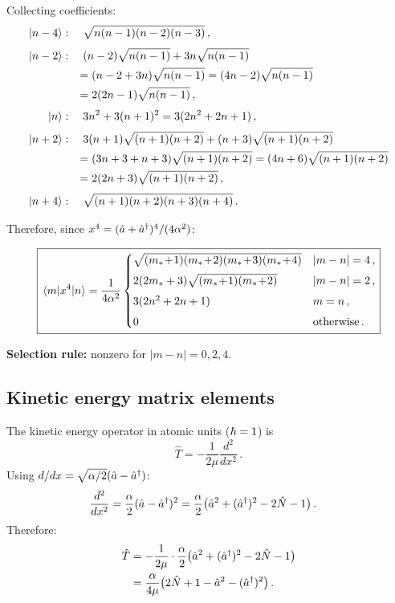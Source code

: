 Collecting coefficients:
\begin{align}
  \ket{n-4}&:\quad \sqrt{n(n-1)(n-2)(n-3)}\,,\notag\\[3pt]
  \ket{n-2}&:\quad (n-2)\sqrt{n(n-1)} + 3n\sqrt{n(n-1)}\notag\\
            &\phantom{:}\quad = (n-2+3n)\sqrt{n(n-1)} = (4n-2)\sqrt{n(n-1)}\notag\\
            &\phantom{:}\quad = 2(2n-1)\sqrt{n(n-1)}\,,\notag\\[3pt]
  \ket{n}&:\quad 3n^2 + 3(n+1)^2 = 3(2n^2+2n+1)\,,\notag\\[3pt]
  \ket{n+2}&:\quad 3(n+1)\sqrt{(n+1)(n+2)} + (n+3)\sqrt{(n+1)(n+2)}\notag\\
            &\phantom{:}\quad = (3n+3+n+3)\sqrt{(n+1)(n+2)} = (4n+6)\sqrt{(n+1)(n+2)}\notag\\
            &\phantom{:}\quad = 2(2n+3)\sqrt{(n+1)(n+2)}\,,\notag\\[3pt]
  \ket{n+4}&:\quad \sqrt{(n+1)(n+2)(n+3)(n+4)}\,.\notag
\end{align}

Therefore, since $x^4 = (\hat{a}+\hat{a}^{\dagger})^4/(4\alpha^2)$:

\begin{equation}\label{eq:x4_HO}
  \boxed{\mel{m}{x^4}{n} = \frac{1}{4\alpha^2}
  \begin{cases}
    \sqrt{(m_*\!+\!1)(m_*\!+\!2)(m_*\!+\!3)(m_*\!+\!4)} & |m-n| = 4\,,\\[4pt]
    2(2m_*+3)\sqrt{(m_*\!+\!1)(m_*\!+\!2)} & |m-n| = 2\,,\\[4pt]
    3(2n^2+2n+1) & m = n\,,\\[4pt]
    0 & \text{otherwise}\,.
  \end{cases}}
\end{equation}

\textbf{Selection rule:} nonzero for $|m-n| = 0, 2, 4$.

\subsection{Kinetic energy matrix elements}\label{sec:HO_kinetic}

The kinetic energy operator in atomic units ($\hbar = 1$) is
\begin{equation}
  \hat{T} = -\frac{1}{2\mu}\frac{d^2}{dx^2}\,.
\end{equation}
Using $d/dx = \sqrt{\alpha/2}(\hat{a} - \hat{a}^{\dagger})$:
\begin{align}
  \frac{d^2}{dx^2} &= \frac{\alpha}{2}(\hat{a}-\hat{a}^{\dagger})^2
  = \frac{\alpha}{2}\bigl(\hat{a}^2 + (\hat{a}^{\dagger})^2 - 2\hat{N} - 1\bigr)\,.
\end{align}
Therefore:
\begin{align}
  \hat{T} &= -\frac{1}{2\mu}\cdot\frac{\alpha}{2}\bigl(\hat{a}^2 + (\hat{a}^{\dagger})^2 - 2\hat{N} - 1\bigr)\notag\\
  &= \frac{\alpha}{4\mu}\bigl(2\hat{N}+1 - \hat{a}^2 - (\hat{a}^{\dagger})^2\bigr)\,.
\end{align}


